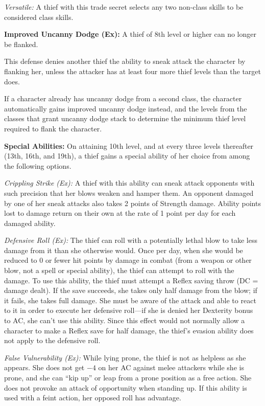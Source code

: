 \textit{Versatile:} A thief with this trade secret selects any two non-class skills to be considered class skills.

\textbf{Improved Uncanny Dodge (Ex):} A thief of 8th level or higher can no longer be flanked.

This defense denies another thief the ability to sneak attack the character by flanking her, unless the attacker has at least four more thief levels than the target does.

If a character already has uncanny dodge from a second class, the character automatically gains improved uncanny dodge instead, and the levels from the classes that grant uncanny dodge stack to determine the minimum thief level required to flank the character.

\textbf{Special Abilities:} On attaining 10th level, and at every three levels thereafter (13th, 16th, and 19th), a thief gains a special ability of her choice from among the following options.

\textit{Crippling Strike (Ex):} A thief with this ability can sneak attack opponents with such precision that her blows weaken and hamper them. An opponent damaged by one of her sneak attacks also takes 2 points of Strength damage. Ability points lost to damage return on their own at the rate of 1 point per day for each damaged ability.

\textit{Defensive Roll (Ex):} The thief can roll with a potentially lethal blow to take less damage from it than she otherwise would. Once per day, when she would be reduced to 0 or fewer hit points by damage in combat (from a weapon or other blow, not a spell or special ability), the thief can attempt to roll with the damage. To use this ability, the thief must attempt a Reflex saving throw (DC = damage dealt). If the save succeeds, she takes only half damage from the blow; if it fails, she takes full damage. She must be aware of the attack and able to react to it in order to execute her defensive roll---if she is denied her Dexterity bonus to AC, she can't use this ability. Since this effect would not normally allow a character to make a Reflex save for half damage, the thief's evasion ability does not apply to the defensive roll.


\textit{False Vulnerability (Ex):} While lying prone, the thief is not as helpless as she appears. She does not get $-4$ on her AC against melee attackers while she is prone, and she can ``kip up'' or leap from a prone position as a free action. She does not provoke an attack of opportunity when standing up. If this ability is used with a feint action, her opposed  roll has advantage.


